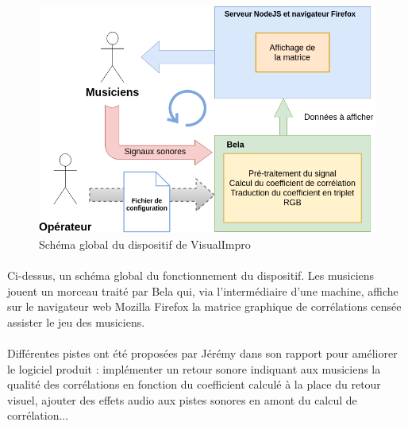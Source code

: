 \begin{figure}[H]
 \centering
 \includegraphics[scale=0.5]{assets/VisualImpro.png}
 \caption{Schéma global du dispositif de VisualImpro}
 \label{schéma global}
\end{figure}

\paragraph{}
Ci-dessus, un schéma global du fonctionnement du dispositif. Les
musiciens jouent un morceau traité par Bela qui, via l'intermédiaire
d'une machine, affiche sur le navigateur web Mozilla Firefox la
matrice graphique de corrélations censée assister le jeu des
musiciens.

\paragraph{}
Différentes pistes ont été proposées par Jérémy dans son rapport pour
améliorer le logiciel produit : implémenter un retour sonore indiquant
aux musiciens la qualité des corrélations en fonction du coefficient
calculé à la place du retour visuel, ajouter des effets audio aux
pistes sonores en amont du calcul de corrélation...
